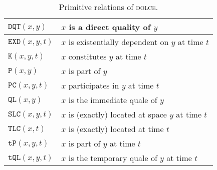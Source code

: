 \documentclass[ao]{iosart2x}
\newcommand{\pr}[1]{\mathtt{#1}}
\newcommand{\dolce}{{\textsc{dolce}}}
\newcommand {\TPd} {\ensuremath{\pr{tP}}}
\newcommand {\Pd} {\ensuremath{\pr{P}}}
\newcommand {\DQTd} {\ensuremath{\pr{DQT}}}
\newcommand {\QLd} {\ensuremath{\pr{QL}}}
\newcommand {\TQLd} {\ensuremath{\pr{tQL}}}
\newcommand {\PCd} {\ensuremath{\pr{PC}}}
\newcommand {\Kd} {\ensuremath{\pr{K}}}
\newcommand {\EXDd} {\ensuremath{\pr{EXD}}}
\newcommand {\SLCd} {\ensuremath{\pr{SLC}}}
\newcommand {\TLCd} {\ensuremath{\pr{TLC}}}
\begin{document}
\begin{table*}
\caption{Primitive relations of {\dolce}.}\label{table_prim_dolce}
\begin{tabular}{|l|l|}
\hline
$\DQTd(x,y)$ & $x$ is a direct quality of $y$ \\
\hline
$\EXDd(x,y,t)$ & $x$ is existentially dependent on $y$ at time $t$\\
\hline
$\Kd(x,y,t)$ & $x$ constitutes $y$  at time $t$ \\
\hline
$\Pd(x,y)$ & $x$ is part of $y$ \\
\hline
$\PCd(x,y,t)$ & $x$ participates in $y$ at time $t$\\
\hline
$\QLd(x,y)$ & $x$ is the immediate quale of $y$ \\
\hline
$\SLCd(x,y,t)$ & $x$ is (exactly) located at space $y$ at time $t$\\
\hline
$\TLCd(x,t)$ & $x$ is (exactly) located at time $t$ \\
\hline
$\TPd(x,y,t)$ & $x$ is part of $y$ at time $t$ \\
\hline
$\TQLd(x,y,t)$ & $x$ is the temporary quale of $y$ at time $t$\\
\hline
\end{tabular}
\end{table*}

\end{document}
